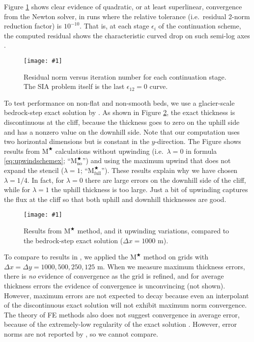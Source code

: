 \documentclass[twocolumn,a4paper]{igs}
\newcommand{\onecol}[1]{\texttt{[image: \#1]}}
\newcommand\eps{\epsilon}
\newcommand{\Mstar}{$\text{M}^{\bigstar}$\xspace}
\newcommand{\Mstarnoup}{$\text{M}^{\bigstar}_{\text{no}}$\xspace}
\newcommand{\Mstarfullup}{$\text{M}^{\bigstar}_{\text{full}}$\xspace}
\begin{document}
Figure \ref{fig:newtonconv} shows clear evidence of quadratic, or at least superlinear, convergence from the Newton solver, in runs where the relative tolerance (i.e.~residual 2-norm reduction factor) is $10^{-10}$.  That is, at each stage $\eps_i$ of the continuation scheme, the computed residual shows the characteristic curved drop on such semi-log axes \citep{Kelley2003}.

\begin{figure}[ht]
\onecol{newtonconv.pdf}
\caption{Residual norm versus iteration number for each continuation stage.  The SIA problem itself is the last $\eps_{12}=0$ curve.}
\label{fig:newtonconv}
\end{figure}

To test performance on non-flat and non-smooth beds, we use a glacier-scale bedrock-step exact solution by \cite{JaroschSchoofAnslow2013}.  As shown in Figure \ref{fig:bedstepprofiles}, the exact thickness is discontinuous at the cliff, because the thickness goes to zero on the uphill side and has a nonzero value on the downhill side.  Note that our computation uses two horizontal dimensions but is constant in the $y$-direction.  The Figure shows results from \Mstar calculations without upwinding (i.e.~$\lambda=0$ in formula \eqref{eq:upwindschemex}; ``\Mstarnoup'') and using the maximum upwind that does not expand the stencil ($\lambda=1$; ``\Mstarfullup'').  These results explain why we have chosen $\lambda=1/4$.  In fact, for $\lambda=0$ there are large errors on the downhill side of the cliff, while for $\lambda=1$ the uphill thickness is too large.  Just a bit of upwinding captures the flux at the cliff so that both uphill and downhill thicknesses are good.

\begin{figure}[ht]
\onecol{bedstepprofiles.pdf}
\caption{Results from \Mstar method, and it upwinding variations, compared to the bedrock-step exact solution ($\Delta x=1000$ m).}
\label{fig:bedstepprofiles}
\end{figure}

To compare to results in \citep{JaroschSchoofAnslow2013}, we applied the \Mstar method on grids with $\Delta x=\Delta y = 1000,500,250,125$ m.  When we measure maximum thickness errors, there is \emph{no} evidence of convergence as the grid is refined, and for average thickness errors the evidence of convergence is unconvincing (not shown).  However, maximum errors are not expected to decay because even an interpolant of the discontinuous exact solution will not exhibit maximum norm convergence.  The theory of FE methods also does not suggest convergence in average error, because of the extremely-low regularity of the exact solution \citep{Elmanetal2005}.  However, error norms are not reported by \cite{JaroschSchoofAnslow2013}, so we cannot compare.
\end{document}

